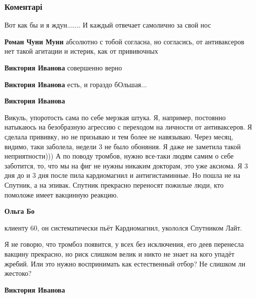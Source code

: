  
 
 
 
 
\subsubsection{Коментарі}

\begin{itemize} %
Вот как бы и я ждун....... И каждый отвечает самолично за свой нос

\begin{itemize} %
\textbf{Роман Чуни Муни} абсолютно с тобой согласна, но согласись, от антиваксеров нет такой агитации и истерик, как от прививочных

\textbf{Виктория Иванова} совершенно верно

\textbf{Виктория Иванова} есть, и гораздо бОльшая...

\textbf{Виктория Иванова} 

Викуль, упоротость сама по себе мерзкая штука. Я, например, постоянно натыкаюсь
на безобразную агрессию с переходом на личности от антиваксеров. Я сделала
прививку, но не призываю и тем более не навязываю. Через месяц, видимо, таки
заболела, недели 3 не было обоняния. Я даже не заметила такой неприятности))) А
по поводу тромбов, нужно все-таки людям самим о себе заботится, то, что мы на
фиг не нужны никаким докторам, это уже аксиома. Я 3 дня до и 3 дня после пила
кардиомагнил и антигистаминные. Но пошла не на Спутник, а на эпивак. Спутник
прекрасно переносят пожилые люди, кто помоложе имеет вакцинную реакцию.

\textbf{Ольга Бо} 

клиенту 60, он систематически пьёт Кардиомагнил, укололся Спутником Лайт.

Я не говорю, что тромбоз появится, у всех без исключения, его деев перенесла
вакцину прекрасно, но риск слишком велик и никто не знает на кого упадёт
жребий. Или это нужно воспринимать как естественный отбор? Не слишком ли
жестоко?

\textbf{Виктория Иванова} 


\end{itemize}
\end{itemize}
